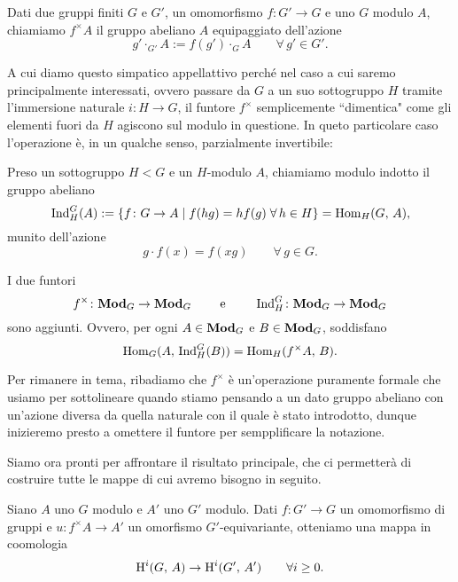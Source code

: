 \begin{definition}
	Dati due gruppi finiti $ G $ e $ G' $, un omomorfismo $ f \colon G' \to G $ e uno $ G $ modulo $ A $, chiamiamo $ f^\times A $ il gruppo abeliano $ A $ equipaggiato dell'azione
	\[ g' \cdot_{G'} A := f(g') \cdot_{G} A \qquad \forall\, g' \in G'. \]
\end{definition}

A cui diamo questo simpatico appellattivo perché nel caso a cui saremo principalmente interessati, ovvero passare da $ G $ a un suo sottogruppo $ H $ tramite l'immersione naturale $ i \colon H \to G $, il funtore $ f^\times $ semplicemente \textquotedblleft dimentica" come gli elementi fuori da $ H $ agiscono sul modulo in questione. In queto particolare caso l'operazione è, in un qualche senso, parzialmente invertibile:

\begin{definition}
	Preso un sottogruppo $ H < G $ e un $ H $-modulo $ A $, chiamiamo modulo indotto il gruppo abeliano
	\[ \operatorname{Ind}_H^G(A) := \{ f \colon G \to A \mid f(hg) = hf(g) \; \forall\, h \in H \} = \operatorname{Hom}_H(G, \, A), \]
	munito dell'azione 
	\[g \cdot f(x) = f(xg) \qquad\forall\, g \in G. \]
	
\end{definition}



\begin{proposition}\label{aggiunzione}
	I due funtori
	\[ f^\times \colon \mathbf{Mod}_G \to \mathbf{Mod}_G \qquad\text{ e }\qquad  \operatorname{Ind}_H^G \colon \mathbf{Mod}_G \to \mathbf{Mod}_G \]
	sono aggiunti. Ovvero, per ogni $ A \in \mathbf{Mod}_G $ e $ B \in \mathbf{Mod}_G $, soddisfano
	\[ \operatorname{Hom}_G(A,\, \operatorname{Ind}_H^G(B)) = \operatorname{Hom}_H(f^\times A, \, B). \]
\end{proposition}

Per rimanere in tema, ribadiamo che $ f^\times $ è un'operazione puramente formale che usiamo per sottolineare quando stiamo pensando a un dato gruppo abeliano con un'azione diversa da quella naturale con il quale è stato introdotto, dunque inizieremo presto a omettere il funtore per sempplificare la notazione.

Siamo ora pronti per affrontare il risultato principale, che ci permetterà di costruire tutte le mappe di cui avremo bisogno in seguito.
\begin{proposition}\label{funct}
	Siano  $ A $ uno $ G $ modulo e $ A' $ uno $ G' $ modulo. Dati $ f \colon G' \to G $ un omomorfismo di gruppi e $ u \colon f^\times A \to A' $ un omorfismo $ G' $-equivariante, otteniamo una mappa in coomologia
	\[ \operatorname{H}^i(G, \, A) \to \operatorname{H}^i(G', \, A') \qquad\forall i \geq 0. \]
\end{proposition}

